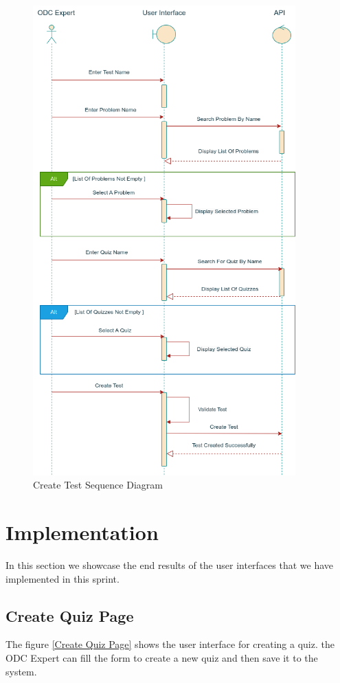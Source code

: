 \begin{figure}[h]
  \centering
  \includegraphics[width=0.9\textwidth, height=0.9\textheight]{images/seq_createTest.png}
  \caption{Create Test Sequence Diagram}\label{Create Test Sequence Diagram}
\end{figure}


\section{Implementation}
In this section we showcase the end results of the user interfaces that we have implemented in this sprint.

\subsection{Create Quiz Page}
The figure \ref{Create Quiz Page} shows the user interface for creating a quiz.
the ODC Expert can fill the form to create a new quiz and then save it to the system.

